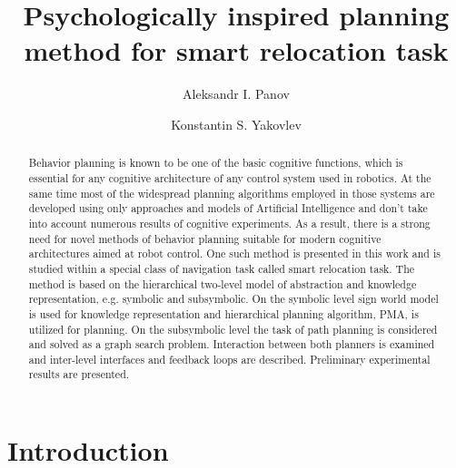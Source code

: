 \documentclass[procedia]{easychair}
\title{Psychologically inspired planning method for smart relocation task}
\author{
    Aleksandr I. Panov\inst{1}
\and
    Konstantin S. Yakovlev\inst{1}
}
\institute{
  Federal Research Center ``Computer Science and Control'' of Russian Academy of Sciences,
  Moscow, Russia\\
  \email{\{pan,yakovlev\}@isa.ru}
 }
\begin{document}
\maketitle


\begin{abstract}
  Behavior planning is known to be one of the basic cognitive functions, which is essential for any cognitive architecture of any control system used in robotics. At the same time most of the widespread planning algorithms employed in those systems are developed using only approaches and models of Artificial Intelligence and don't take into account numerous results of cognitive experiments. As a result, there is a strong need for novel methods of behavior planning suitable for modern cognitive architectures aimed at robot control. One such method is presented in this work and is studied within a special class of navigation task called smart relocation task. The method is based on the hierarchical two-level model of abstraction and knowledge representation, e.g. symbolic and subsymbolic. On the symbolic level sign world model is used for knowledge representation and hierarchical planning algorithm, PMA, is utilized for planning. On the subsymbolic level the task of path planning is considered and solved as a graph search problem. Interaction between both planners is examined and inter-level interfaces and feedback loops are described. Preliminary experimental results are presented.
\end{abstract}


%
%


\section{Introduction}
\label{sect:introduction}
\end{document}
